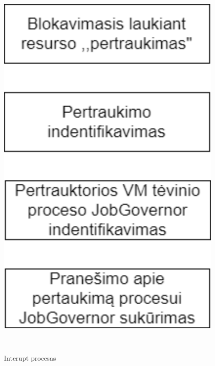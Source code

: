 \documentclass[oneside]{VUMIFPSkursinis}
\begin{document}
\begin{figure}[H]
		\centering	
	\includegraphics[width=18cm,height=20cm,keepaspectratio]{Interupt.png}
	\caption{Interupt procesas}
	\label{fig:Interupt procesas}
\end{figure}
\end{document}
